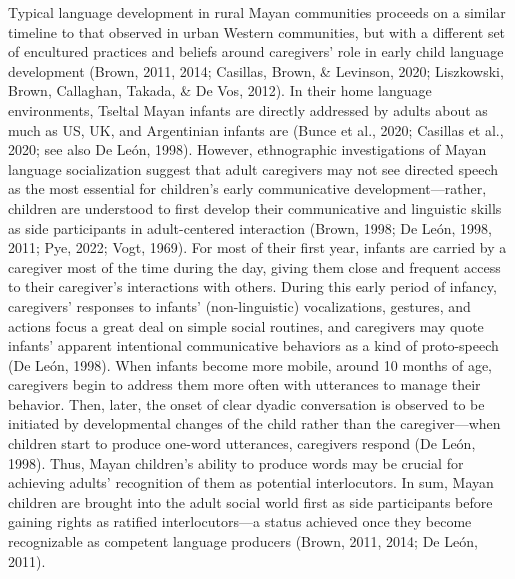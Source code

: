 \documentclass[
  man]{apa6}
\begin{document}
Typical language development in rural Mayan communities proceeds on a similar timeline to that observed in urban Western communities, but with a different set of encultured practices and beliefs around caregivers' role in early child language development (Brown, 2011, 2014; Casillas, Brown, \& Levinson, 2020; Liszkowski, Brown, Callaghan, Takada, \& De Vos, 2012). In their home language environments, Tseltal Mayan infants are directly addressed by adults about as much as US, UK, and Argentinian infants are (Bunce et al., 2020; Casillas et al., 2020; see also De León, 1998). However, ethnographic investigations of Mayan language socialization suggest that adult caregivers may not see directed speech as the most essential for children's early communicative development---rather, children are understood to first develop their communicative and linguistic skills as side participants in adult-centered interaction (Brown, 1998; De León, 1998, 2011; Pye, 2022; Vogt, 1969). For most of their first year, infants are carried by a caregiver most of the time during the day, giving them close and frequent access to their caregiver's interactions with others. During this early period of infancy, caregivers' responses to infants' (non-linguistic) vocalizations, gestures, and actions focus a great deal on simple social routines, and caregivers may quote infants' apparent intentional communicative behaviors as a kind of proto-speech (De León, 1998). When infants become more mobile, around 10 months of age, caregivers begin to address them more often with utterances to manage their behavior. Then, later, the onset of clear dyadic conversation is observed to be initiated by developmental changes of the child rather than the caregiver---when children start to produce one-word utterances, caregivers respond (De León, 1998). Thus, Mayan children's ability to produce words may be crucial for achieving adults' recognition of them as potential interlocutors. In sum, Mayan children are brought into the adult social world first as side participants before gaining rights as ratified interlocutors---a status achieved once they become recognizable as competent language producers (Brown, 2011, 2014; De León, 2011).
\end{document}
